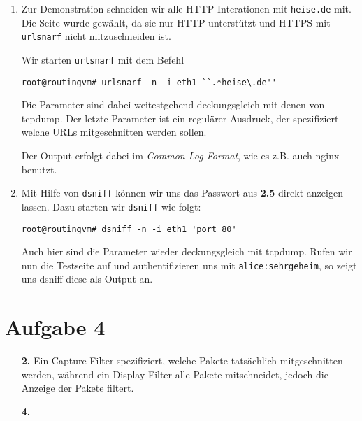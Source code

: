 \documentclass{scrartcl}
\begin{document}
    \begin{enumerate}[\bf 1.]
        \item Zur Demonstration schneiden wir alle HTTP-Interationen mit \texttt{heise.de}
              mit. Die Seite wurde gewählt, da sie nur HTTP unterstützt und HTTPS
              mit \texttt{urlsnarf} nicht mitzuschneiden ist.

              Wir starten \texttt{urlsnarf} mit dem Befehl
              \begin{lstlisting}[style=BashInputStyle]
root@routingvm# urlsnarf -n -i eth1 ``.*heise\.de''
              \end{lstlisting}

              Die Parameter sind dabei weitestgehend deckungsgleich mit denen
              von tcpdump. Der letzte Parameter ist ein regulärer Ausdruck, der
              spezifiziert welche URLs mitgeschnitten werden sollen.

              Der Output erfolgt dabei im \textit{Common Log Format}, wie es z.B.
              auch nginx benutzt.

        \item Mit Hilfe von \texttt{dsniff} können wir uns das Passwort aus \textbf{2.5}
              direkt anzeigen lassen. Dazu starten wir \texttt{dsniff} wie folgt:

              \begin{lstlisting}[style=BashInputStyle]
root@routingvm# dsniff -n -i eth1 'port 80'
              \end{lstlisting}

              Auch hier sind die Parameter wieder deckungsgleich mit tcpdump.
              Rufen wir nun die Testseite auf und authentifizieren uns mit
              \texttt{alice:sehrgeheim}, so zeigt uns dsniff diese als Output an.
    \end{enumerate}

    \section{Aufgabe 4}
    \label{sec:Aufgabe 4}

    \begin{enumerate}[\bf 1.]
        \item[\bf 2.] Ein Capture-Filter spezifiziert, welche Pakete tatsächlich
                      mitgeschnitten werden, während ein Display-Filter alle
                      Pakete mitschneidet, jedoch die Anzeige der Pakete filtert.

        \item[\bf 4.]
    \end{enumerate}
\end{document}
